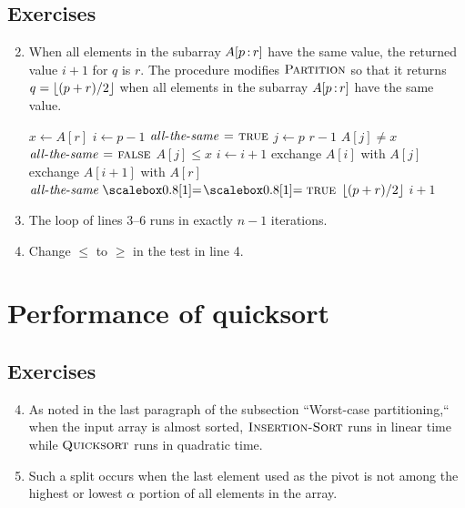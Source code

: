 \subsection*{Exercises}
\begin{enumerate}[\thesection-1]
%
\setcounter{enumi}{1}
%
\item When all elements in the subarray $A[p \subarr r]$ have the same value, the returned value $i + 1$ for $q$ is $r$. The procedure modifies $\textnormal{\scshape Partition}$ so that it returns $q = \left\lfloor(p + r) / 2\right\rfloor$ when all elements in the subarray $A[p \subarr r]$ have the same value.
\begin{codebox}
\li $x \gets A[r]$
\li $i \gets p - 1$
\li $\id{all-the-same} \gets \const{true}$
\li \For $j \gets p$ \To $r - 1$
\li \Do
         \If   $A[j] \neq x$
\li      \Then
               $\id{all-the-same} \gets \const{false}$
         \End
\li      \If   $A[j] \leq x$
\li      \Then
               $i \gets i + 1$
\li            exchange $A[i]$ with $A[j]$
         \End
    \End
\li exchange $A[i + 1]$ with $A[r]$
\li \If $\id{all-the-same} \isequal \const{true}$
\li \Then \Return $\left\lfloor(p + r) / 2\right\rfloor$
\li \Else \Return $i + 1$
    \End
\end{codebox}
%
\item The loop of lines 3--6 runs in exactly $n - 1$ iterations.
%
\item Change $\leq$ to $\geq$ in the  test in line 4.
%
\end{enumerate}


\section{Performance of quicksort}
\subsection*{Exercises}
\begin{enumerate}[\thesection-1]
%
\setcounter{enumi}{3}
%
\item As noted in the last paragraph of the subsection ``Worst-case partitioning,`` when the input array is almost sorted, $\textnormal{\scshape Insertion-Sort}$ runs in linear time while $\textnormal{\scshape Quicksort}$ runs in quadratic time.
%
\setcounter{enumi}{5}
%
\item Such a split occurs when the last element used as the pivot is not among the highest or lowest $\alpha$ portion of all elements in the array.
%
\end{enumerate}


